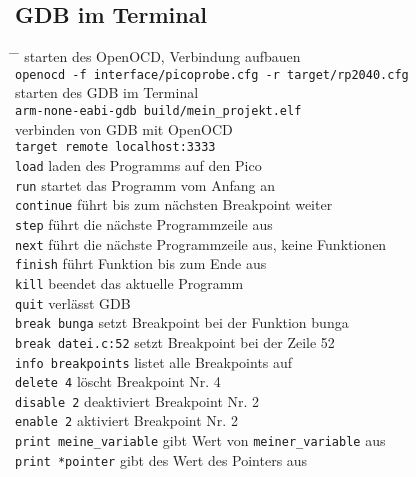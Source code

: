 \documentclass[a4paper,12pt,twoside]{article}
\begin{document}
\subsection{GDB im Terminal} \label{subsec:terminal}
\begin{tabbing}
	\hspace{5mm} \= \hspace{50mm} \= \kill
	\>  \hspace{2mm}  starten des OpenOCD, Verbindung aufbauen \\
	\> \verb|openocd -f interface/picoprobe.cfg -r target/rp2040.cfg| \\
	\> \hspace{2mm} starten des GDB im Terminal \\
	\> \verb|arm-none-eabi-gdb build/mein_projekt.elf| \\
	\>  \hspace{2mm}verbinden von GDB mit OpenOCD \\
	\> \verb|target remote localhost:3333| \\
	\> \verb|load| \> laden des Programms auf den Pico \\
	\> \verb|run| \> startet das Programm vom Anfang an \\
	\> \verb|continue| \> führt bis zum nächsten Breakpoint weiter \\
	\> \verb|step| \> führt die nächste Programmzeile aus \\
	\> \verb|next| \> führt die nächste Programmzeile aus, keine Funktionen \\
	\> \verb|finish| \> führt Funktion bis zum Ende aus \\
	\> \verb|kill| \> beendet das aktuelle Programm \\
	\> \verb|quit| \> verlässt GDB \\
	\> \verb|break bunga| \> setzt Breakpoint bei der Funktion bunga \\
	\> \verb|break datei.c:52| \> setzt Breakpoint bei der Zeile 52 \\
	\> \verb|info breakpoints| \> listet alle Breakpoints auf \\
	\> \verb|delete 4| \> löscht Breakpoint Nr. 4 \\
	\> \verb|disable 2| \> deaktiviert Breakpoint Nr. 2 \\
	\> \verb|enable 2| \> aktiviert Breakpoint Nr. 2 \\
	\> \verb|print meine_variable| \> gibt Wert von \verb|meiner_variable| aus \\
	\> \verb|print *pointer| \> gibt des Wert des Pointers aus \\

\end{tabbing}
\end{document}
